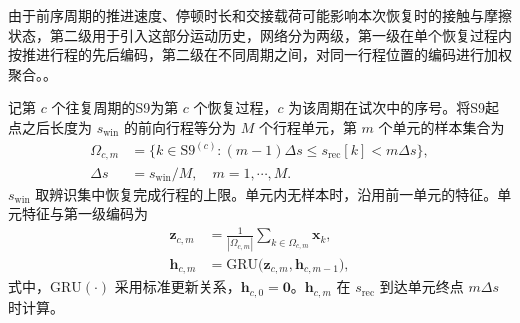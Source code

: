 \documentclass{JQRnew}
\begin{document}
由于前序周期的推进速度、停顿时长和交接载荷可能影响本次恢复时的接触与摩擦状态，第二级用于引入这部分运动历史，网络分为两级，第一级在单个恢复过程内按推进行程的先后编码，第二级在不同周期之间，对同一行程位置的编码进行加权聚合。。

记第 $c$ 个往复周期的S9为第 $c$ 个恢复过程，$c$ 为该周期在试次中的序号。将S9起点之后长度为 $s_{\mathrm{win}}$ 的前向行程等分为 $M$ 个行程单元，第 $m$ 个单元的样本集合为
\begin{equation}
\label{eq:phase}
\begin{aligned}
\Omega_{c,m}&=\big\{k\in\mathrm{S9}^{(c)}:(m-1)\Delta s\le s_{\mathrm{rec}}[k]<m\Delta s\big\},\\
\Delta s&=s_{\mathrm{win}}/M,\quad m=1,\cdots,M.
\end{aligned}
\end{equation}
$s_{\mathrm{win}}$ 取辨识集中恢复完成行程的上限。单元内无样本时，沿用前一单元的特征。单元特征与第一级编码为
\begin{equation}
\label{eq:cell-encoder}
\begin{aligned}
\bm z_{c,m}&=\frac{1}{|\Omega_{c,m}|}\sum_{k\in\Omega_{c,m}}\bm x_k,\\
\bm h_{c,m}&=\mathrm{GRU}\big(\bm z_{c,m},\bm h_{c,m-1}\big),
\end{aligned}
\end{equation}
式中，$\mathrm{GRU}(\cdot)$ 采用标准更新关系，$\bm h_{c,0}=\bm 0$。$\bm h_{c,m}$ 在 $s_{\mathrm{rec}}$ 到达单元终点 $m\Delta s$ 时计算。
\end{document}
